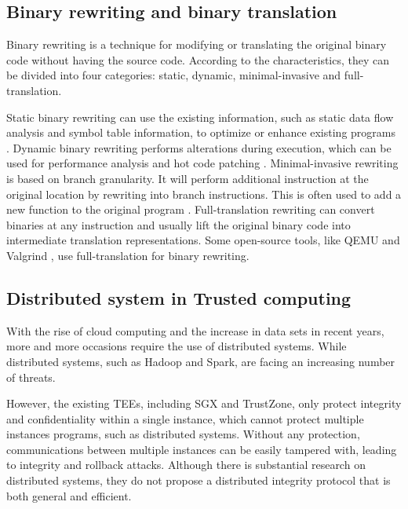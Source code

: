 
\subsection{Binary rewriting and binary translation}
Binary rewriting is a technique for modifying or translating the original binary code
without having the source code. According to the characteristics, they can be divided
into four categories: static, dynamic, minimal-invasive and full-translation.

Static binary rewriting can use the existing information, such as static data flow analysis and
symbol table information, to optimize or enhance existing programs \cite{10.1145/2629335, Schwarz2007PLTOAL}.
Dynamic binary rewriting performs alterations during execution, which can be used for
performance analysis \cite{Luk2005PinBC} and hot code patching \cite{Bruening2003AnIF}.
Minimal-invasive rewriting is based on branch granularity. It will perform additional instruction
at the original location by rewriting into branch instructions. This is often used to add a new
function to the original program \cite{Federico2017revngAU}.
Full-translation rewriting can convert binaries at any instruction and usually lift the original
binary code into intermediate translation representations. Some open-source tools,
like QEMU \cite{Bellard2005QEMUAF} and Valgrind \cite{Nethercote2007ValgrindAF},
use full-translation for binary rewriting.


\subsection{Distributed system in Trusted computing}
With the rise of cloud computing and the increase in data sets in recent years,
more and more occasions require the use of distributed systems.
While distributed systems, such as Hadoop and Spark, are facing an increasing number
of threats.

However, the existing TEEs, including SGX and TrustZone, only protect integrity
and confidentiality within a single instance, which cannot protect multiple
instances programs, such as distributed systems.
Without any protection, communications between multiple instances can be easily
tampered with, leading to integrity and rollback attacks.
Although there is substantial research on distributed systems, they do not propose a
distributed integrity protocol that is both general and efficient.

